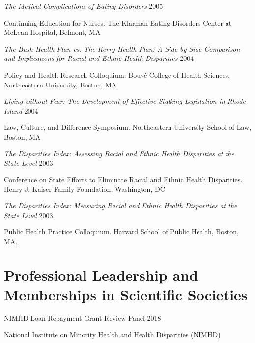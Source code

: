 \documentclass[10pt,]{article}
\begin{document}
{{{{{{{{{{{{{{{\begin{hangparas}{.5in}{1}
{\textit {The Medical Complications of Eating Disorders}} \hfill 2005 
\vspace{-2.5mm}
\begin{adjustwidth}{0.5cm}{1cm}
Continuing Education for Nurses. The Klarman Eating Disorders Center at McLean Hospital, Belmont, MA
\end{adjustwidth}

{\textit {The Bush Health Plan vs. The Kerry Health Plan: A Side by Side Comparison and Implications for Racial and Ethnic Health Disparities}} \hfill 2004 
\vspace{-2.5mm}
\begin{adjustwidth}{0.5cm}{1cm}
Policy and Health Research Colloquium. Bouvé College of Health Sciences, Northeastern University, Boston, MA
\end{adjustwidth}

{\textit {Living without Fear: The Development of Effective Stalking Legislation in Rhode Island}} \hfill 2004 
\vspace{-2.5mm}
\begin{adjustwidth}{0.5cm}{1cm}
Law, Culture, and Difference Symposium. Northeastern University School of Law, Boston, MA
\end{adjustwidth}

{\textit {The Disparities Index: Assessing Racial and Ethnic Health Disparities at the State Level}} \hfill 2003 
\vspace{-2.5mm}
\begin{adjustwidth}{0.5cm}{1cm}
Conference on State Efforts to Eliminate Racial and Ethnic Health Disparities. Henry J. Kaiser Family Foundation, Washington, DC
\end{adjustwidth}

{\textit {The Disparities Index: Measuring Racial and Ethnic Health Disparities at the State Level}} \hfill 2003 
\vspace{-2.5mm}
\begin{adjustwidth}{0.5cm}{1cm}
Public Health Practice Colloquium. Harvard School of Public Health, Boston, MA.
\end{adjustwidth}

\end{hangparas}

\section{\Large \sc Professional Leadership and Memberships in Scientific Societies}

NIMHD Loan Repayment Grant Review Panel \hfill {2018-{\small{}}}
\vspace{-2.5mm}
\begin{adjustwidth}{0.5cm}{1cm}
National Institute on Minority Health and Health Disparities (NIMHD) 
\end{adjustwidth}

}}}}}}}}}}}}}}}
\end{document}
